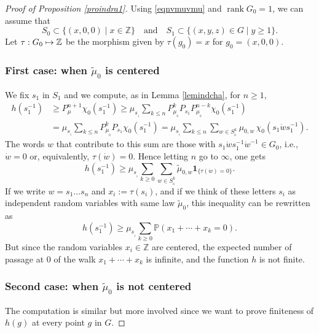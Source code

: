 \documentclass[11pt]{article}
\newcommand{\ie}{i.e.,\xspace}
\numberwithin{equation}{section}
\def\mto{\mathchoice{\longmapsto}{\mapsto}{\mapsto}{\mapsto}}
\DeclareMathOperator{\rank}{rank}
\theoremstyle{definition}
\newcommand{\m}[1]{\mathbb{ #1}}
\begin{document}
\begin{proof}[Proof of Proposition \ref{proindra1}]
Using \eqref{eqnvmuvmu} and $\rank G_0=1$, we can assume that
\[
S_0\subset \{ (x,0,0)\mid x\in \m Z\}
\quad\text{and}\quad
S_1\subset \{ (x,y,z)\in G\mid y\geq 1\}.
\]
Let $\tau:G_0\mto \m Z$ be the morphism given by
$\tau(g_0)=x$ for $g_0=(x,0,0)$.

\subsubsection*{First case: when $\widetilde{\mu}_0$ is centered}
We fix $s_1$ in $S_1$ and we compute, as in Lemma \ref{lemindcha}, for $n\geq 1$,
\begin{equation}
\label{eqnhspnch}
\begin{aligned}
h(s_1^{-1})&\geq
P_\mu^{n+1}\chi_0(s_1^{-1})
\geq
\mu_{s_{_1}}\sum_{k\leq n}
P^k_{\mu_{_0}}P_{s_1}P^{n-k}_{\mu_{_0}}\chi_0(s_1^{-1})\\
&=
\mu_{s_{_1}}\sum_{k\leq n}
P^k_{\mu_{_0}}P_{s_1}\chi_0(s_1^{-1})=
\mu_{s_{_1}}\sum_{k\leq n}
\sum_{w\in S_{_0}^k}\mu_{0,w}\,\chi_0(s_1\dot{w}s_1^{-1}).
\end{aligned}
\end{equation}
The words $w$ that contribute to this sum are those with
$s_1\dot{w}s_1^{-1}\dot{w}^{-1}\in G_0$, \ie
$\dot{w} =0$ or, equivalently, $\tau(\dot{w})=0.$
Hence letting $n$ go to $\infty$, one gets
\[
h(s_1^{-1})
\geq
\mu_{s_{_1}}\sum_{k\geq 0}
\sum_{w\in S_{_0}^k}\widetilde{\mu}_{0,w}\mathbf{1}_{\{\tau(\dot{w})=0\}}.
\]
If we write $w=s_1\ldots s_n$ and $x_i:=\tau(s_i)$,
and if we think of these letters $s_i$ as independent random variables with same law $\widetilde{\mu}_0$,
this inequality can be rewritten as
\[
h(s_1^{-1})
\geq
\mu_{s_{_1}}\sum_{k\geq 0}
\m P(x_1+\cdots +x_k=0).
\]
But since the random variables $x_i\in \m Z$ are centered,
the expected number of passage at $0$ of the walk $x_1+\cdots +x_k$ is infinite, and the function $h$ is not finite.

\subsubsection*{Second case: when $\widetilde{\mu}_0$ is not centered}
The computation is similar but more involved since
we want to prove finiteness of $h(g)$ at every point $g$ in $G$.


\end{proof}
\end{document}
